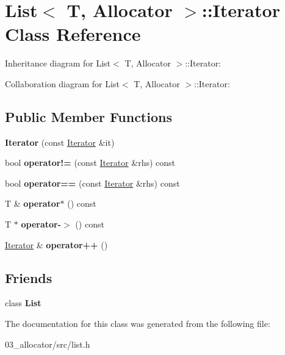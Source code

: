 \hypertarget{classList_1_1Iterator}{}\section{List$<$ T, Allocator $>$\+:\+:Iterator Class Reference}
\label{classList_1_1Iterator}


Inheritance diagram for List$<$ T, Allocator $>$\+:\+:Iterator\+:


Collaboration diagram for List$<$ T, Allocator $>$\+:\+:Iterator\+:
\subsection*{Public Member Functions}
\begin{DoxyCompactItemize}
\item 
\mbox{\label{classList_1_1Iterator_a6dd85fc01e52fd88d4ef068d0714d709}} 
{\bfseries Iterator} (const \hyperlink{classList_1_1Iterator}{Iterator} \&it)
\item 
\mbox{\label{classList_1_1Iterator_ae0d630b9e77a8ac6db697313e0dfe76e}} 
bool {\bfseries operator!=} (const \hyperlink{classList_1_1Iterator}{Iterator} \&rhs) const
\item 
\mbox{\label{classList_1_1Iterator_a184afa9f69bf7a2cc0e32ea5a676ba37}} 
bool {\bfseries operator==} (const \hyperlink{classList_1_1Iterator}{Iterator} \&rhs) const
\item 
\mbox{\label{classList_1_1Iterator_aadd4e235f4050049bf76528bdbd8fdba}} 
T \& {\bfseries operator$\ast$} () const
\item 
\mbox{\label{classList_1_1Iterator_a563005558a0b989277cda9e36852e034}} 
T $\ast$ {\bfseries operator-\/$>$} () const
\item 
\mbox{\label{classList_1_1Iterator_a933bd35873258d608f4eefe770da6e9f}} 
\hyperlink{classList_1_1Iterator}{Iterator} \& {\bfseries operator++} ()
\end{DoxyCompactItemize}
\subsection*{Friends}
\begin{DoxyCompactItemize}
\item 
\mbox{\label{classList_1_1Iterator_a8cee552d09eaeb60a09d95309a87b498}} 
class {\bfseries List}
\end{DoxyCompactItemize}


The documentation for this class was generated from the following file\+:\begin{DoxyCompactItemize}
\item 
03\+\_\+allocator/src/list.\+h\end{DoxyCompactItemize}
